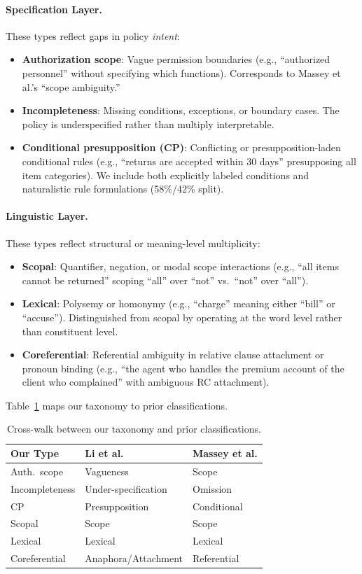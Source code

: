 \documentclass[11pt]{article}
\begin{document}
\paragraph{Specification Layer.} These types reflect gaps in policy \emph{intent}:
\begin{itemize}
\item \textbf{Authorization scope}: Vague permission boundaries (e.g., ``authorized personnel'' without specifying which functions). Corresponds to Massey et al.'s ``scope ambiguity.''
\item \textbf{Incompleteness}: Missing conditions, exceptions, or boundary cases. The policy is underspecified rather than multiply interpretable.
\item \textbf{Conditional presupposition (CP)}: Conflicting or presupposition-laden conditional rules (e.g., ``returns are accepted within 30 days'' presupposing all item categories). We include both explicitly labeled conditions and naturalistic rule formulations (58\%/42\% split).
\end{itemize}

\paragraph{Linguistic Layer.} These types reflect structural or meaning-level multiplicity:
\begin{itemize}
\item \textbf{Scopal}: Quantifier, negation, or modal scope interactions (e.g., ``all items cannot be returned'' scoping ``all'' over ``not'' vs.\ ``not'' over ``all'').
\item \textbf{Lexical}: Polysemy or homonymy (e.g., ``charge'' meaning either ``bill'' or ``accuse''). Distinguished from scopal by operating at the word level rather than constituent level.
\item \textbf{Coreferential}: Referential ambiguity in relative clause attachment or pronoun binding (e.g., ``the agent who handles the premium account of the client who complained'' with ambiguous RC attachment).
\end{itemize}

Table~\ref{tab:taxonomy_crosswalk} maps our taxonomy to prior classifications.

\begin{table}[t]
\centering
\small
\caption{Cross-walk between our taxonomy and prior classifications.}
\label{tab:taxonomy_crosswalk}
\begin{tabular}{lll}
\toprule
\textbf{Our Type} & \textbf{Li et al.} & \textbf{Massey et al.} \\
\midrule
Auth.\ scope & Vagueness & Scope \\
Incompleteness & Under-specification & Omission \\
CP & Presupposition & Conditional \\
Scopal & Scope & Scope \\
Lexical & Lexical & Lexical \\
Coreferential & Anaphora/Attachment & Referential \\
\bottomrule
\end{tabular}
\end{table}
\end{document}
